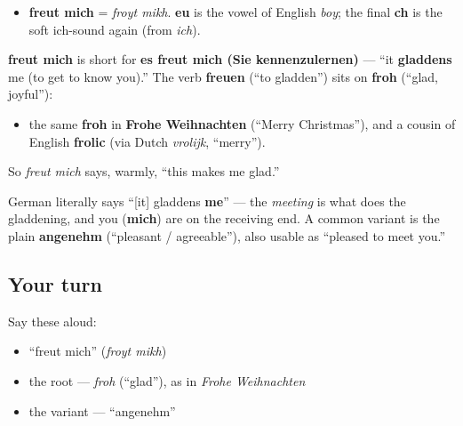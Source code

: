 \begin{sounds}
\begin{itemize}
\raggedright
  \item \textbf{freut mich} = \emph{froyt mikh}. \textbf{eu} is the vowel of English \emph{boy}; the final \textbf{ch} is the soft ich-sound again (from \emph{ich}).
\end{itemize}
\end{sounds}

\begin{cousinweb}
\textbf{freut mich} is short for \textbf{es freut mich (Sie kennenzulernen)} — \textquotedblleft{}it \textbf{gladdens} me (to get to know you).\textquotedblright{} The verb \textbf{freuen} (\textquotedblleft{}to gladden\textquotedblright{}) sits on \textbf{froh} (\textquotedblleft{}glad, joyful\textquotedblright{}):

\begin{itemize}
\raggedright
  \item the same \textbf{froh} in \textbf{Frohe Weihnachten} (\textquotedblleft{}Merry Christmas\textquotedblright{}), and a cousin of English \textbf{frolic} (via Dutch \emph{vrolijk}, \textquotedblleft{}merry\textquotedblright{}).
\end{itemize}

So \emph{freut mich} says, warmly, \textquotedblleft{}this makes me glad.\textquotedblright{}
\end{cousinweb}

\begin{grammarlens}[title={Grammar Lens: \textquotedblleft{}it gladdens \emph{me}\textquotedblright{}}]
German literally says \textquotedblleft{}{[}it{]} gladdens \textbf{me}\textquotedblright{} — the \emph{meeting} is what does the gladdening, and you (\textbf{mich}) are on the receiving end. A common variant is the plain \textbf{angenehm} (\textquotedblleft{}pleasant / agreeable\textquotedblright{}), also usable as \textquotedblleft{}pleased to meet you.\textquotedblright{}
\end{grammarlens}

\subsection*{Your turn}
Say these aloud:

\begin{itemize}
\raggedright
  \item \textquotedblleft{}freut mich\textquotedblright{} (\emph{froyt mikh})
  \item the root — \emph{froh} (\textquotedblleft{}glad\textquotedblright{}), as in \emph{Frohe Weihnachten}
  \item the variant — \textquotedblleft{}angenehm\textquotedblright{}
\end{itemize}

